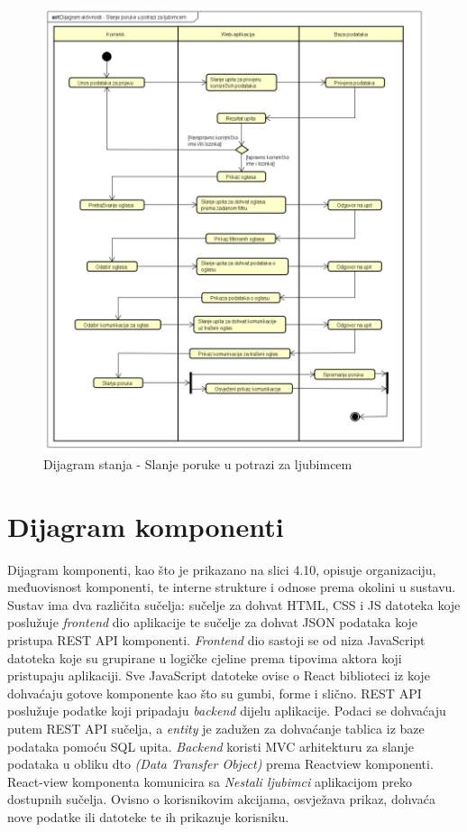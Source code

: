 \begin{figure}[!htb]
	\centering
	\includegraphics[width=\textwidth]{slike/Dijagram_aktivnosti_-_Slanje_poruke_u_potrazi_za_ljubimcem.png}
	\caption{Dijagram stanja - Slanje poruke u potrazi za ljubimcem}
\end{figure}

\clearpage
\newpage
\eject

\section{Dijagram komponenti}

\noindent Dijagram komponenti, kao što je prikazano na slici 4.10, opisuje organizaciju, međuovisnost komponenti, te interne strukture i odnose prema okolini u sustavu. Sustav ima dva različita sučelja: sučelje za dohvat HTML, CSS i JS datoteka koje poslužuje \textit{frontend} dio aplikacije te sučelje za dohvat JSON podataka koje pristupa REST API komponenti. \textit{Frontend} dio sastoji se od niza JavaScript datoteka koje su grupirane u logičke cjeline prema tipovima aktora koji pristupaju aplikaciji. Sve JavaScript datoteke ovise o React biblioteci iz koje dohvaćaju gotove komponente kao što su gumbi, forme i slično. REST API poslužuje podatke koji pripadaju \textit{backend} dijelu aplikacije. Podaci se dohvaćaju putem REST API sučelja, a \textit{entity} je zadužen za dohvaćanje tablica iz baze podataka pomoću SQL upita. \textit{Backend} koristi MVC arhitekturu za slanje podataka u obliku dto \textit{(Data Transfer Object)} prema Reactview komponenti. React-view komponenta komunicira sa \textit{Nestali ljubimci} aplikacijom preko dostupnih sučelja. Ovisno o korisnikovim akcijama, osvježava prikaz, dohvaća nove podatke ili datoteke te ih prikazuje korisniku.

